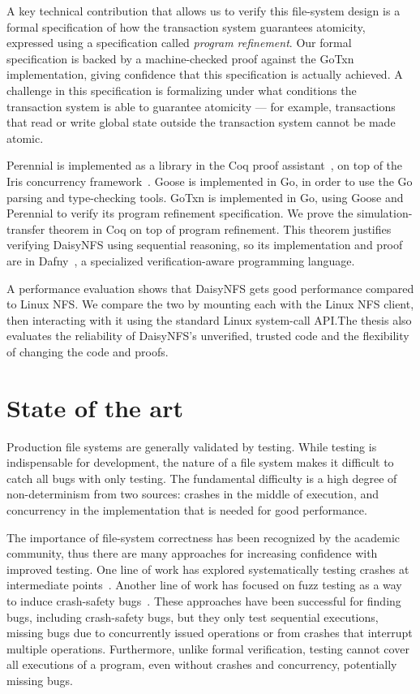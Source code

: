 A key technical contribution that allows us to verify this file-system design is
a formal specification of how the transaction system guarantees atomicity,
expressed using a specification called \emph{program refinement}. Our
formal specification is backed by a machine-checked proof against the GoTxn
implementation, giving confidence that this specification is actually achieved.
A challenge in this specification is formalizing under what conditions the
transaction system is able to guarantee atomicity --- for example, transactions
that read or write global state outside the transaction system cannot be made atomic.

Perennial is implemented as a library in the Coq proof assistant~\cite{coq}, on
top of the Iris concurrency framework~\cite{jung:iris-jfp}. Goose is implemented
in Go, in order to use the Go parsing and type-checking tools. GoTxn is
implemented in Go, using Goose and Perennial to verify its program refinement
specification. We prove the simulation-transfer theorem in Coq on top of program
refinement. This theorem justifies verifying DaisyNFS using sequential
reasoning, so its implementation and proof are in Dafny~\cite{dafny-refman}, a
specialized verification-aware programming language.

A performance evaluation shows that DaisyNFS gets good performance compared to
Linux NFS. We compare the two by mounting each with the Linux NFS client, then
interacting with it using the standard Linux system-call API.\@ The thesis also
evaluates the reliability of DaisyNFS's unverified, trusted code and the
flexibility of changing the code and proofs.

\section{State of the art}

Production file systems are generally validated by testing. While testing is
indispensable for development, the nature of a file system makes it difficult to
catch all bugs with only testing. The fundamental difficulty is a high degree of
non-determinism from two sources: crashes in the middle of execution, and
concurrency in the implementation that is needed for good performance.

The importance of file-system correctness has been recognized by the academic
community, thus there are many approaches for increasing confidence with
improved testing. One line of work has explored systematically testing crashes
at intermediate points~\cite{mohan:crashmonkey,pillai:appcrash,yang:explode}. Another line of
work has focused on fuzz testing as a way to induce crash-safety
bugs~\cite{xu:janus,kim:hydra}. These approaches have been successful for
finding bugs, including crash-safety bugs, but they only test sequential
executions, missing bugs due to concurrently issued operations or from crashes
that interrupt multiple operations. Furthermore, unlike formal verification, testing cannot
cover all executions of a program, even without crashes and concurrency,
potentially missing bugs.

